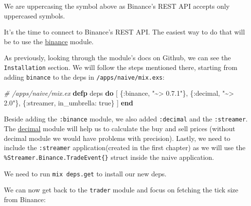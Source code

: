 \documentclass[
  oneside]{book}
\newenvironment{Shaded}{\begin{snugshade}}{\end{snugshade}}
\newcommand{\CommentTok}[1]{\textcolor[rgb]{0.56,0.35,0.01}{\textit{#1}}}
\newcommand{\ConstantTok}[1]{\textcolor[rgb]{0.00,0.00,0.00}{#1}}
\newcommand{\KeywordTok}[1]{\textcolor[rgb]{0.13,0.29,0.53}{\textbf{#1}}}
\newcommand{\NormalTok}[1]{#1}
\newcommand{\StringTok}[1]{\textcolor[rgb]{0.31,0.60,0.02}{#1}}
\newcommand{\VariableTok}[1]{\textcolor[rgb]{0.00,0.00,0.00}{#1}}
\begin{document}
We are uppercasing the symbol above as Binance's REST API accepts only uppercased symbols.

It's the time to connect to Binance's REST API. The easiest way to do that will be to use the \href{https://github.com/dvcrn/binance.ex}{binance} module.

As previously, looking through the module's docs on Github, we can see the \texttt{Installation} section. We will follow the steps mentioned there, starting from adding \texttt{binance} to the deps in \texttt{/apps/naive/mix.exs}:

\begin{Shaded}
\begin{Highlighting}[]
  \CommentTok{\# /apps/naive/mix.ex}
  \KeywordTok{defp}\NormalTok{ deps }\KeywordTok{do}
\NormalTok{    [}
\NormalTok{      \{}\VariableTok{:binance}\NormalTok{, }\StringTok{"\textasciitilde{}\textgreater{} 0.7.1"}\NormalTok{\},}
\NormalTok{      \{}\VariableTok{:decimal}\NormalTok{, }\StringTok{"\textasciitilde{}\textgreater{} 2.0"}\NormalTok{\},}
\NormalTok{      \{}\VariableTok{:streamer}\NormalTok{, }\VariableTok{in\_umbrella:} \ConstantTok{true}\NormalTok{\}}
\NormalTok{    ]}
  \KeywordTok{end}
\end{Highlighting}
\end{Shaded}

Beside adding the \texttt{:binance} module, we also added \texttt{:decimal} and the \texttt{:streamer}. The \href{https://github.com/ericmj/decimal}{decimal} module will help us to calculate the buy and sell prices (without decimal module we would have problems with precision). Lastly, we need to include the \texttt{:streamer} application(created in the first chapter) as we will use the \texttt{\%Streamer.Binance.TradeEvent\{\}} struct inside the naive application.

We need to run \texttt{mix\ deps.get} to install our new deps.

We can now get back to the \texttt{trader} module and focus on fetching the tick size from Binance:
\end{document}
